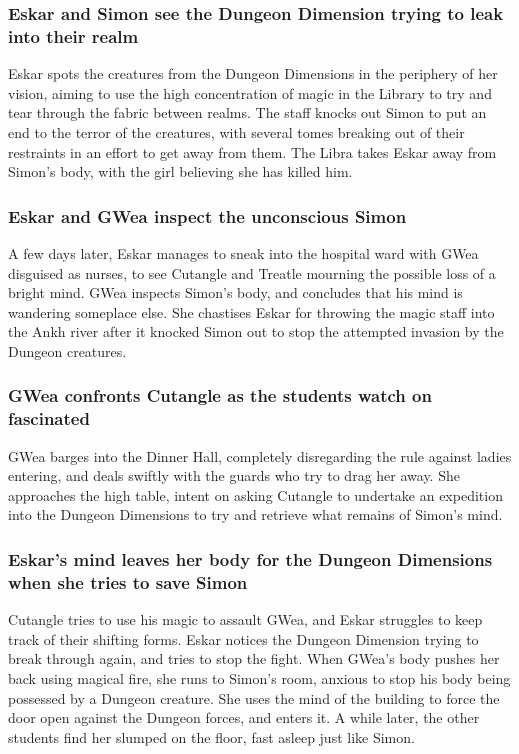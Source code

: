 \subsubsection{\Gls{Eskar} and \Gls{Simon} see the Dungeon Dimension trying to leak into their
    realm}
\Gls{Eskar} spots the creatures from the Dungeon Dimensions in the periphery of her vision, aiming
to use the high concentration of magic in the Library to try and tear through the fabric between
realms. The staff knocks out \Gls{Simon} to put an end to the terror of the creatures, with several
tomes breaking out of their restraints in an effort to get away from them. The \Gls{Libra} takes
\Gls{Eskar} away from \Gls{Simon}'s body, with the girl believing she has killed him.

\subsubsection{\Gls{Eskar} and \Gls{GWea} inspect the unconscious \Gls{Simon}}
A few days later, \Gls{Eskar} manages to sneak into the hospital ward with \Gls{GWea} disguised as
nurses, to see \Gls{Cutangle} and \Gls{Treatle} mourning the possible loss of a bright mind.
\Gls{GWea} inspects \Gls{Simon}'s body, and concludes that his mind is wandering someplace else.
She chastises \Gls{Eskar} for throwing the magic staff into the Ankh river after it knocked
\Gls{Simon} out to stop the attempted invasion by the Dungeon creatures.

\subsubsection{\Gls{GWea} confronts \Gls{Cutangle} as the students watch on fascinated}
\Gls{GWea} barges into the Dinner Hall, completely disregarding the rule against ladies entering,
and deals swiftly with the guards who try to drag her away. She approaches the high table, intent
on asking \Gls{Cutangle} to undertake an expedition into the Dungeon Dimensions to try and retrieve
what remains of \Gls{Simon}'s mind.

\subsubsection{\Gls{Eskar}'s mind leaves her body for the Dungeon Dimensions when she tries to
    save \Gls{Simon}}
\Gls{Cutangle} tries to use his magic to assault \Gls{GWea}, and \Gls{Eskar} struggles to keep track
of their shifting forms. \Gls{Eskar} notices the Dungeon Dimension trying to break through again,
and tries to stop the fight. When \Gls{GWea}'s body pushes her back using magical fire, she runs
to \Gls{Simon}'s room, anxious to stop his body being possessed by a Dungeon creature. She uses
the mind of the building to force the door open against the Dungeon forces, and enters it. A while
later, the other students find her slumped on the floor, fast asleep just like \Gls{Simon}.

